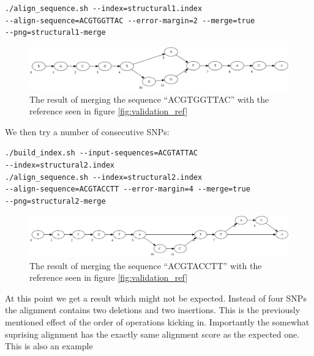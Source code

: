 \documentclass[thesis.tex]{subfiles}
\begin{document}
\texttt{./align\_sequence.sh -{}-index=structural1.index \\
-{}-align-sequence=ACGTGGTTAC -{}-error-margin=2 -{}-merge=true \\
-{}-png=structural1-merge}\\
\begin{figure}[H]
  \begin{mdframed}
  \includegraphics[width=\textwidth]{output/structural1-merge.png}
  \caption{The result of merging the sequence ``ACGTGGTTAC'' with the reference seen in figure \ref{fig:validation_ref}}
  \end{mdframed}
\end{figure}
\noindent
We then try a number of consecutive SNPs:\\
\par\noindent
\texttt{./build\_index.sh -{}-input-sequences=ACGTATTAC \\
-{}-index=structural2.index}\\
\texttt{./align\_sequence.sh -{}-index=structural2.index \\
-{}-align-sequence=ACGTACCTT -{}-error-margin=4 -{}-merge=true \\
-{}-png=structural2-merge}\\
\begin{figure}[H]
  \begin{mdframed}
  \includegraphics[width=\textwidth]{output/structural2-merge.png}
  \end{mdframed}
  \caption{The result of merging the sequence ``ACGTACCTT'' with the reference seen in figure \ref{fig:validation_ref}}
\end{figure}
\noindent
At this point we get a result which might not be expected. Instead of four SNPs the alignment contains two deletions and two insertions. This is the previously mentioned effect of the order of operations kicking in. Importantly the somewhat suprising alignment has the exactly same alignment score as the expected one. This is also an example 
\end{document}
